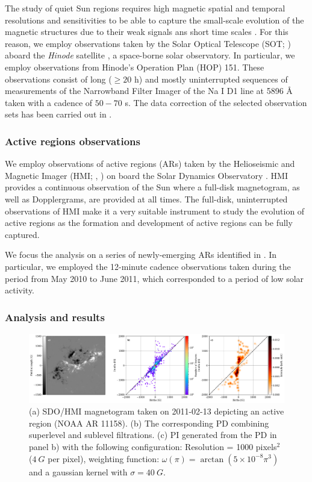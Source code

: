 \documentclass[12pt]{mythesis}
\begin{document}
The study of quiet Sun regions requires high magnetic spatial and temporal resolutions and sensitivities to be able to capture the small-scale evolution of the magnetic structures due to their weak signals ans short time scales \citep{quiet_sun_living_review}. For this reason, we employ observations taken by the Solar Optical Telescope (SOT; \citealt{sot}) aboard the \textit{Hinode} satellite \citep{Hinode}, a space-borne solar observatory. In particular, we employ observations from Hinode's Operation Plan (HOP) 151. These observations consist of long ($\ge 20$ h) and mostly uninterrupted sequences of measurements of the Narrowband Filter Imager of the Na I D1 line at 5896 \r{A} taken with a cadence of $50-70$ s. The data correction of the selected observation sets has been carried out in \citep{gosic}.


\subsubsection{Active regions observations}

We employ observations of active regions (ARs) taken by the Helioseismic and Magnetic Imager (HMI; \citealt{hmi1}, \citealt{hmi2}) on board the Solar Dynamics Observatory \citep{SDO}. HMI provides a continuous observation of the Sun where a full-disk magnetogram, as well as Dopplergrams, are provided at all times. The full-disk, uninterrupted observations of HMI make it a very suitable instrument to study the evolution of active regions as the formation and development of active regions can be fully captured. 

We focus the analysis on a series of newly-emerging ARs identified in \citep{toriumi}. In particular, we employed the 12-minute cadence observations taken during the period from May 2010 to June 2011, which corresponded to a period of low solar activity.

\subsubsection{Analysis and results}

\begin{figure}
    \centering
     \includegraphics[width=\textwidth]{figures/PersistentHomology/PI_PD_example.pdf}
    \caption{(a) SDO/HMI magnetogram taken on 2011-02-13 depicting an active region (NOAA AR 11158). (b) The corresponding PD combining superlevel and sublevel filtrations. (c) PI generated from the PD in panel b) with the following configuration: Resolution =  1000 pixels$^2$ ($4\ G$ per pixel), weighting function: $\omega (\pi) = \arctan (5\times 10 ^{-8} \pi ^{3})$ and a gaussian kernel with $\sigma = 40\ G$.}
   \label{fig: PD+PI_example}
\end{figure}
\end{document}

